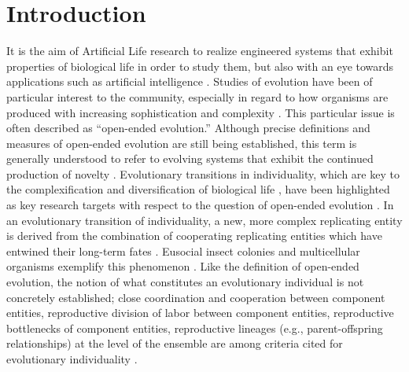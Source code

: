 \section{Introduction}

It is the aim of Artificial Life research to realize engineered systems that exhibit properties of biological life in order to study them, but also with an eye towards applications such as artificial intelligence \citep{bedau2003artificial}.
Studies of evolution have been of particular interest to the community, especially in regard to how organisms are produced with increasing sophistication and complexity \citep{goldsby2017increasing}.
This particular issue is often described as ``open-ended evolution.''
Although precise definitions and measures of open-ended evolution are still being established, this term is generally understood to refer to evolving systems that exhibit the continued production of novelty \citep{taylor2016open}.
Evolutionary transitions in individuality, which are key to the complexification and diversification of biological life \citep{smith1997major}, have been highlighted as key research targets with respect to the question of open-ended evolution \citep{ray1996evolving, banzhaf2016defining}.
In an evolutionary transition of individuality, a new, more complex replicating entity is derived from the combination of cooperating replicating entities which have entwined their long-term fates \citep{west2015major}.
Eusocial insect colonies and multicellular organisms exemplify this phenomenon \citep{smith1997major}.
Like the definition of open-ended evolution, the notion of what constitutes an evolutionary individual is not concretely established;
close coordination and cooperation between component entities, reproductive division of labor between component entities, reproductive bottlenecks of component entities, reproductive lineages (e.g., parent-offspring relationships) at the level of the ensemble are among criteria cited for evolutionary individuality
\citep{ereshefsky2015rethinking, bouchard2013symbiotic}.

